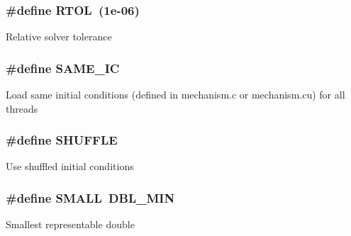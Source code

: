 \subsubsection[{\texorpdfstring{R\+T\+OL}{RTOL}}]{\setlength{\rightskip}{0pt plus 5cm}\#define R\+T\+OL~(1e-\/06)}\hypertarget{solver__options_8cuh_af50ac611d9fae906f9419504fd2caa5d}{}\label{solver__options_8cuh_af50ac611d9fae906f9419504fd2caa5d}
Relative solver tolerance 
\subsubsection[{\texorpdfstring{S\+A\+M\+E\+\_\+\+IC}{SAME_IC}}]{\setlength{\rightskip}{0pt plus 5cm}\#define S\+A\+M\+E\+\_\+\+IC}\hypertarget{solver__options_8cuh_aa98acf0dc83a3dce3ba168d75a74cb1b}{}\label{solver__options_8cuh_aa98acf0dc83a3dce3ba168d75a74cb1b}
Load same initial conditions (defined in mechanism.\+c or mechanism.\+cu) for all threads 
\subsubsection[{\texorpdfstring{S\+H\+U\+F\+F\+LE}{SHUFFLE}}]{\setlength{\rightskip}{0pt plus 5cm}\#define S\+H\+U\+F\+F\+LE}\hypertarget{solver__options_8cuh_a0b43a0be2f674fea3218e7fb5221db1f}{}\label{solver__options_8cuh_a0b43a0be2f674fea3218e7fb5221db1f}
Use shuffled initial conditions 
\subsubsection[{\texorpdfstring{S\+M\+A\+LL}{SMALL}}]{\setlength{\rightskip}{0pt plus 5cm}\#define S\+M\+A\+LL~D\+B\+L\+\_\+\+M\+IN}\hypertarget{solver__options_8cuh_a09c78d2f8feb311dd9fc969a0bf84979}{}\label{solver__options_8cuh_a09c78d2f8feb311dd9fc969a0bf84979}
Smallest representable double 
